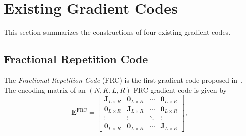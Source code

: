 \documentclass[lettersize,journal]{IEEEtran}
\renewcommand{\u}{\boldsymbol{u}}
\renewcommand{\v}{\boldsymbol{v}}
\newcommand{\norm}[1]{\left\lVert#1\right\rVert}
\newcommand{\ones}[1]{\boldsymbol{1}_{#1}}
\newcommand{\ident}[1]{\boldsymbol{I}_{#1}}
\newcommand{\allones}[1]{\boldsymbol{J}_{#1}}
\newcommand{\allzeros}[1]{\boldsymbol{0}_{#1}}
\newcommand{\GF}{\boldsymbol{E}^{\mathrm{FRC}}}
\newcommand{\BE}{\boldsymbol{E}}
\newcommand{\RR}{\mathbb{R}}
\newcommand{\lele}{\textcolor{cyan}}
\newcommand{\jossierevised}{\textcolor{orange}}
\begin{document}

\section{Existing Gradient Codes}
This section summarizes the constructions of four existing gradient codes.
\subsection{Fractional Repetition Code}
The \textit{Fractional Repetition Code} (FRC) is the first gradient code proposed in~\cite{frc}. The encoding matrix of an $(N, K, L, R)$-FRC gradient code is given by
\begin{equation*}
\GF = \begin{bmatrix}
        \allones{L\times R} & \allzeros{L\times R} & \cdots & \allzeros{L\times R} \\
        \allzeros{L\times R} & \allones{L\times R} & \cdots & \allzeros{L\times R} \\
        \vdots & \vdots & \ddots & \vdots \\
        \allzeros{L\times R} & \allzeros{L\times R} & \cdots & \allones{L\times R}
        \end{bmatrix},
\end{equation*}
\end{document}
